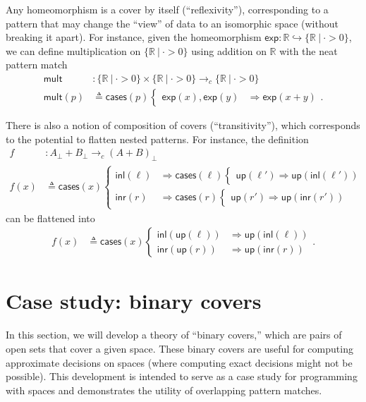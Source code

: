 \documentclass[conference]{IEEEtran}
\newcommand{\hookto}{\hookrightarrow}
\newcommand{\cto}{\to_c}
\newcommand{\R}{\mathbb{R}}
\newcommand{\suchthat}{\ |\ }
\newcommand{\Branch}{\Rightarrow}
\newcommand{\up}{\mathsf{up}}
\begin{document}
Any homeomorphism is a cover by itself (``reflexivity''), corresponding to a pattern that may change the ``view'' of data to an isomorphic space (without breaking it apart). For instance, given the homeomorphism $\mathsf{exp} : \R \hookto \{ \R \suchthat \cdot > 0 \}$, we can define multiplication on $\{\R \suchthat \cdot > 0 \}$ using addition on $\R$ with the neat pattern match
\begin{align*}
\mathsf{mult} &: \{\R \suchthat \cdot > 0 \} \times \{\R \suchthat \cdot > 0 \} \cto \{\R \suchthat \cdot > 0 \}
\\ \mathsf{mult}(p) &\triangleq \mathsf{cases}(p)
\begin{cases}
\mathsf{exp}(x), \mathsf{exp}(y) &\Branch \mathsf{exp}(x + y)
\end{cases}.
\end{align*}

There is also a notion of composition of covers (``transitivity''), which corresponds to the potential to flatten nested patterns. For instance, the definition
\begin{align*}
f &: A_\bot + B_\bot \cto \left(A + B\right)_\bot
\\ f(x) &\triangleq \mathsf{cases}(x)
\begin{cases}
\mathsf{inl}(\ell) &\Branch \mathsf{cases}(\ell)
  \begin{cases}
  \up(\ell') \Branch \up(\mathsf{inl}(\ell'))
  \end{cases}
\\
\mathsf{inr}(r) &\Branch \mathsf{cases}(r)
  \begin{cases}
  \up(r') \Branch \up(\mathsf{inr}(r'))
  \end{cases}
\end{cases}
\end{align*}
can be flattened into
\begin{align*}
f(x) &\triangleq \mathsf{cases}(x)
\begin{cases}
\mathsf{inl}(\up(\ell)) &\Branch \up(\mathsf{inl}(\ell))
\\
\mathsf{inr}(\up(r)) &\Branch \up(\mathsf{inr}(r))
\end{cases}.
\end{align*}


\section{Case study: binary covers}
\label{s:bcover}

In this section, we will develop a theory of ``binary covers,'' which are pairs of open sets that cover a given space. These binary covers are useful for computing approximate decisions on spaces (where computing exact decisions might not be possible). This development is intended to serve as a case study for programming with spaces and demonstrates the utility of overlapping pattern matches.
\end{document}
